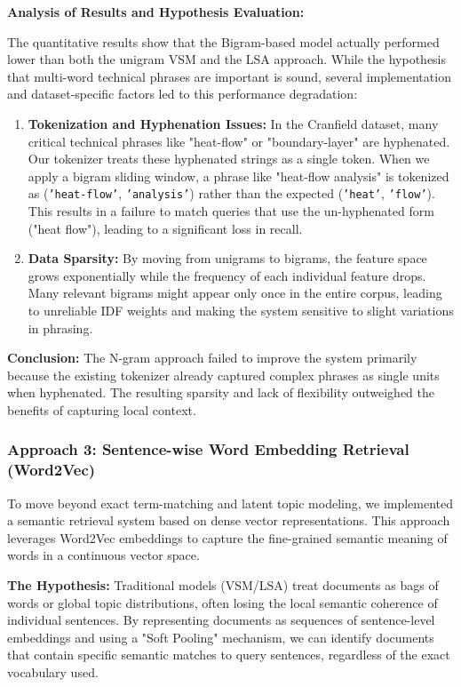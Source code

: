 \documentclass{article}
\begin{document}
\textbf{Analysis of Results and Hypothesis Evaluation:}

The quantitative results show that the Bigram-based model actually performed lower than both the unigram VSM and the LSA approach. While the hypothesis that multi-word technical phrases are important is sound, several implementation and dataset-specific factors led to this performance degradation:

\begin{enumerate}
    \item \textbf{Tokenization and Hyphenation Issues:} In the Cranfield dataset, many critical technical phrases like "heat-flow" or "boundary-layer" are hyphenated. Our tokenizer treats these hyphenated strings as a single token. When we apply a bigram sliding window, a phrase like "heat-flow analysis" is tokenized as (\texttt{'heat-flow'}, \texttt{'analysis'}) rather than the expected (\texttt{'heat'}, \texttt{'flow'}). This results in a failure to match queries that use the un-hyphenated form ("heat flow"), leading to a significant loss in recall.
    
    \item \textbf{Data Sparsity:} By moving from unigrams to bigrams, the feature space grows exponentially while the frequency of each individual feature drops. Many relevant bigrams might appear only once in the entire corpus, leading to unreliable IDF weights and making the system sensitive to slight variations in phrasing.
    

\end{enumerate}

\textbf{Conclusion:} The N-gram approach failed to improve the system primarily because the existing tokenizer already captured complex phrases as single units when hyphenated. The resulting sparsity and lack of flexibility outweighed the benefits of capturing local context.

\subsubsection{Approach 3: Sentence-wise Word Embedding Retrieval (Word2Vec)}

To move beyond exact term-matching and latent topic modeling, we implemented a semantic retrieval system based on dense vector representations. This approach leverages Word2Vec embeddings to capture the fine-grained semantic meaning of words in a continuous vector space.

\textbf{The Hypothesis:} Traditional models (VSM/LSA) treat documents as bags of words or global topic distributions, often losing the local semantic coherence of individual sentences. By representing documents as sequences of sentence-level embeddings and using a "Soft Pooling" mechanism, we can identify documents that contain specific semantic matches to query sentences, regardless of the exact vocabulary used.
\end{document}
